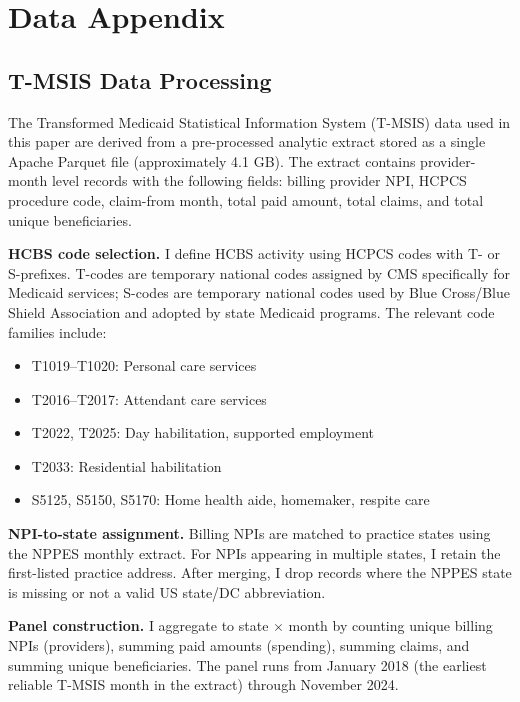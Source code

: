 \documentclass[12pt]{article}
\begin{document}
\label{apep_main_text_end}
\newpage


\newpage
\appendix

\section{Data Appendix}

\subsection{T-MSIS Data Processing}

The Transformed Medicaid Statistical Information System (T-MSIS) data used in this paper are derived from a pre-processed analytic extract stored as a single Apache Parquet file (approximately 4.1 GB). The extract contains provider-month level records with the following fields: billing provider NPI, HCPCS procedure code, claim-from month, total paid amount, total claims, and total unique beneficiaries.

\textbf{HCBS code selection.} I define HCBS activity using HCPCS codes with T- or S-prefixes. T-codes are temporary national codes assigned by CMS specifically for Medicaid services; S-codes are temporary national codes used by Blue Cross/Blue Shield Association and adopted by state Medicaid programs. The relevant code families include:
\begin{itemize}
\item T1019--T1020: Personal care services
\item T2016--T2017: Attendant care services
\item T2022, T2025: Day habilitation, supported employment
\item T2033: Residential habilitation
\item S5125, S5150, S5170: Home health aide, homemaker, respite care
\end{itemize}

\textbf{NPI-to-state assignment.} Billing NPIs are matched to practice states using the NPPES monthly extract. For NPIs appearing in multiple states, I retain the first-listed practice address. After merging, I drop records where the NPPES state is missing or not a valid US state/DC abbreviation.

\textbf{Panel construction.} I aggregate to state $\times$ month by counting unique billing NPIs (providers), summing paid amounts (spending), summing claims, and summing unique beneficiaries. The panel runs from January 2018 (the earliest reliable T-MSIS month in the extract) through November 2024.
\end{document}
